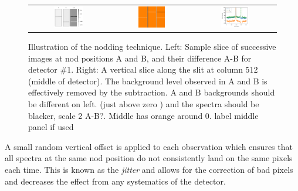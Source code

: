 \begin{figure}
    \centering
    \begin{tabular}{ccc}
        \includegraphics[width=0.4\textwidth]{figures/reduction/nod_image_sample.pdf} &  \includegraphics[width=0.35\textwidth]{figures/reduction/Nods_AB_A-B.png} &
        \includegraphics[width=0.37\textwidth]{figures/reduction/nod_slice_example.pdf}\\
    \end{tabular}
    \caption{Illustration of the nodding technique. Left: Sample slice of successive images at nod positions A and B, and their difference A-B for detector \#1. Right: A vertical slice along the slit at column 512 (middle of detector). The background level observed in A and B is effectively removed by the subtraction. {\red{} A and B backgrounds should be different on left. (just above zero ) and the spectra should be blacker, scale 2 A-B?}. Middle has orange around 0. {\red{} label middle panel if used}}
    \label{fig:nodimages}
\end{figure}

A small random vertical offset is applied to each observation which ensures that all spectra at the same nod position do not consistently land on the same pixels each time. This is known as the \emph{jitter} and allows for the correction of bad pixels and decreases the effect from any systematics of the detector.

